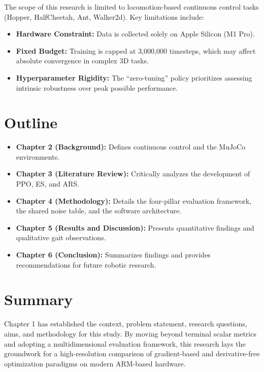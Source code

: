 The scope of this research is limited to locomotion-based continuous control tasks (Hopper, HalfCheetah, Ant, Walker2d). Key limitations include:

\begin{itemize}
    \item \textbf{Hardware Constraint:} Data is collected solely on Apple Silicon (M1 Pro).
    \item \textbf{Fixed Budget:} Training is capped at 3,000,000 timesteps, which may affect absolute convergence in complex 3D tasks.
    \item \textbf{Hyperparameter Rigidity:} The ``zero-tuning'' policy prioritizes assessing intrinsic robustness over peak possible performance.
\end{itemize}

\section{Outline}

\begin{itemize}
    \item \textbf{Chapter 2 (Background):} Defines continuous control and the MuJoCo environments.
    \item \textbf{Chapter 3 (Literature Review):} Critically analyzes the development of PPO, ES, and ARS.
    \item \textbf{Chapter 4 (Methodology):} Details the four-pillar evaluation framework, the shared noise table, and the software architecture.
    \item \textbf{Chapter 5 (Results and Discussion):} Presents quantitative findings and qualitative gait observations.
    \item \textbf{Chapter 6 (Conclusion):} Summarizes findings and provides recommendations for future robotic research.
\end{itemize}

\section{Summary}

Chapter 1 has established the context, problem statement, research questions, aims, and methodology for this study. By moving beyond terminal scalar metrics and adopting a multidimensional evaluation framework, this research lays the groundwork for a high-resolution comparison of gradient-based and derivative-free optimization paradigms on modern ARM-based hardware.

\clearpage
\null %
\clearpage